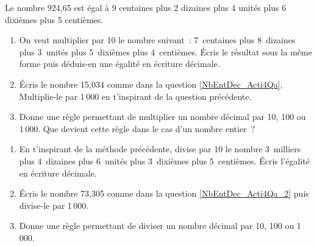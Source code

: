 \begin{activite}

\begin{partie}
Le nombre 924,65 est égal à 9 centaines plus 2 dizaines plus 4 unités plus 6 dixièmes plus 5 centièmes.
\begin{enumerate}
 \item On veut multiplier par 10 le nombre suivant : 7 centaines plus 8 dizaines plus 3 unités plus 5 dixièmes plus 4 centièmes. Écris le résultat sous la même forme puis déduis-en une égalité en écriture décimale. \label{NbEntDec_Acti4Qa}
 \item Écris le nombre 15,034 comme dans la question \ref{NbEntDec_Acti4Qa}. Multiplie‑le par 1\,000 en t'inspirant de la question précédente.
 \item Donne une règle permettant de multiplier un nombre décimal par 10, 100 ou 1\,000. Que devient cette règle dans le cas d'un nombre entier ?
 \end{enumerate}
\end{partie}

\begin{partie}
\begin{enumerate}
 \item En t'inspirant de la méthode précédente, divise par 10 le nombre 3 milliers plus 4 dizaines plus 6 unités plus 3 dixièmes plus 5 centièmes. Écris l'égalité en écriture décimale. \label{NbEntDec_Acti4Qa_2}
 \item Écris le nombre 73,305 comme dans la question \ref{NbEntDec_Acti4Qa_2} puis divise‑le par 1\,000.
 \item Donne une règle permettant de diviser un nombre décimal par 10, 100 ou 1\,000.
 \end{enumerate}
\end{partie}

\end{activite}



